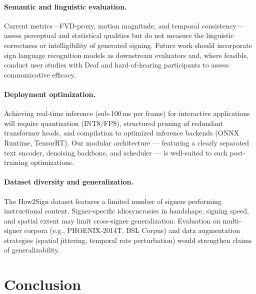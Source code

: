 \documentclass{ieeeaccess}
\begin{document}
\paragraph{Semantic and linguistic evaluation.} Current metrics---FVD-proxy, motion magnitude, and temporal consistency---assess perceptual and statistical qualities but do not measure the linguistic correctness or intelligibility of generated signing. Future work should incorporate sign language recognition models as downstream evaluators and, where feasible, conduct user studies with Deaf and hard-of-hearing participants to assess communicative efficacy.

\paragraph{Deployment optimization.} Achieving real-time inference (sub-100\,ms per frame) for interactive applications will require quantization (INT8/FP8), structured pruning of redundant transformer heads, and compilation to optimized inference backends (ONNX Runtime, TensorRT). Our modular architecture — featuring a clearly separated text encoder, denoising backbone, and scheduler — is well-suited to such post-training optimizations.

\paragraph{Dataset diversity and generalization.} The How2Sign dataset features a limited number of signers performing instructional content. Signer-specific idiosyncrasies in handshape, signing speed, and spatial extent may limit cross-signer generalization. Evaluation on multi-signer corpora (e.g., PHOENIX-2014T, BSL Corpus) and data augmentation strategies (spatial jittering, temporal rate perturbation) would strengthen claims of generalizability.

\section{Conclusion}
\label{sec:conclusion}
\end{document}
